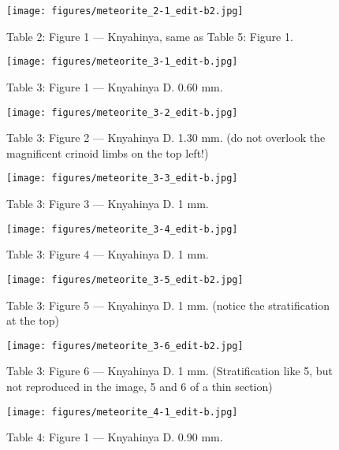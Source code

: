 \documentclass[a4paper, 12pt, oneside]{article}
\begin{document}
\clearpage
{}
\begin{figure}[t]
\texttt{[image: figures/meteorite\_2-1\_edit-b2.jpg]}
\caption{Table 2: Figure 1 --- Knyahinya, same as Table 5: Figure 1.}
\centering
\end{figure}
\clearpage
{}
\begin{figure}[t]
\texttt{[image: figures/meteorite\_3-1\_edit-b.jpg]}
\caption{Table 3: Figure 1 --- Knyahinya D. 0.60 mm.}
\centering
\end{figure}
\clearpage
\begin{figure}[t]
\texttt{[image: figures/meteorite\_3-2\_edit-b.jpg]}
\caption{Table 3: Figure 2 --- Knyahinya D. 1.30 mm. (do not overlook the magnificent crinoid limbs on the top left!)}
\centering
\end{figure}
\clearpage
\begin{figure}[t]
\texttt{[image: figures/meteorite\_3-3\_edit-b.jpg]}
\caption{Table 3: Figure 3 --- Knyahinya D. 1 mm.}
\centering
\end{figure}
\clearpage
\begin{figure}[t]
\texttt{[image: figures/meteorite\_3-4\_edit-b.jpg]}
\caption{Table 3: Figure 4 --- Knyahinya D. 1 mm.}
\centering
\end{figure}
\clearpage
\begin{figure}[t]
\texttt{[image: figures/meteorite\_3-5\_edit-b2.jpg]}
\caption{Table 3: Figure 5 --- Knyahinya D. 1 mm. (notice the stratification at the top)}
\centering
\end{figure}
\clearpage
\begin{figure}[t]
\texttt{[image: figures/meteorite\_3-6\_edit-b2.jpg]}
\caption{Table 3: Figure 6 --- Knyahinya D. 1 mm. (Stratification like 5, but not reproduced in the image, 5 and 6 of a thin section)}
\centering
\end{figure}
\clearpage
{}
\begin{figure}[t]
\texttt{[image: figures/meteorite\_4-1\_edit-b.jpg]}
\caption{Table 4: Figure 1 --- Knyahinya D. 0.90 mm.}
\centering
\end{figure}
\end{document}
